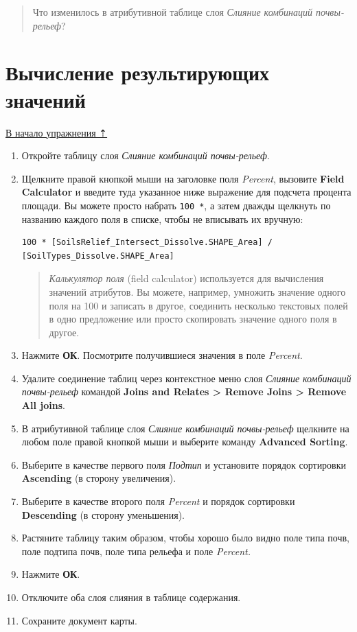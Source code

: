 \documentclass[12pt,]{book}
\begin{document}
\begin{quote}
Что изменилось в атрибутивной таблице слоя \emph{Слияние комбинаций почвы-рельеф}?
\end{quote}

\hypertarget{overlay-resulting}{%
\section{Вычисление результирующих значений}\label{overlay-resulting}}

\protect\hyperlink{overlay}{В начало упражнения ⇡}

\begin{enumerate}
\def\labelenumi{\arabic{enumi}.}
\item
  Откройте таблицу слоя \emph{Слияние комбинаций почвы-рельеф}.
\item
  Щелкните правой кнопкой мыши на заголовке поля \emph{Percent}, вызовите \textbf{Field Calculator} и введите туда указанное ниже выражение для подсчета процента площади. Вы можете просто набрать \texttt{100\ *}, а затем дважды щелкнуть по названию каждого поля в списке, чтобы не вписывать их вручную:

\begin{verbatim}
100 * [SoilsRelief_Intersect_Dissolve.SHAPE_Area] /
[SoilTypes_Dissolve.SHAPE_Area]
\end{verbatim}

  \begin{quote}
  \emph{Калькулятор поля} (field calculator) используется для вычисления значений атрибутов. Вы можете, например, умножить значение одного поля на 100 и записать в другое, соединить несколько текстовых полей в одно предложение или просто скопировать значение одного поля в другое.
  \end{quote}
\item
  Нажмите \textbf{ОК}. Посмотрите получившиеся значения в поле \emph{Percent}.
\item
  Удалите соединение таблиц через контекстное меню слоя \emph{Слияние комбинаций почвы-рельеф} командой \textbf{Joins and Relates \textgreater{} Remove Joins \textgreater{} Remove All joins}.
\item
  В атрибутивной таблице слоя \emph{Слияние комбинаций почвы-рельеф} щелкните на любом поле правой кнопкой мыши и выберите команду \textbf{Advanced Sorting}.
\item
  Выберите в качестве первого поля \emph{Подтип} и установите порядок сортировки \textbf{Ascending} (в сторону увеличения).
\item
  Выберите в качестве второго поля \emph{Percent} и порядок сортировки \textbf{Descending} (в сторону уменьшения).
\item
  Растяните таблицу таким образом, чтобы хорошо было видно поле типа почв, поле подтипа почв, поле типа рельефа и поле \emph{Percent.}
\item
  Нажмите \textbf{ОК}.
\item
  Отключите оба слоя слияния в таблице содержания.
\item
  Сохраните документ карты.


\end{enumerate}
\end{document}
